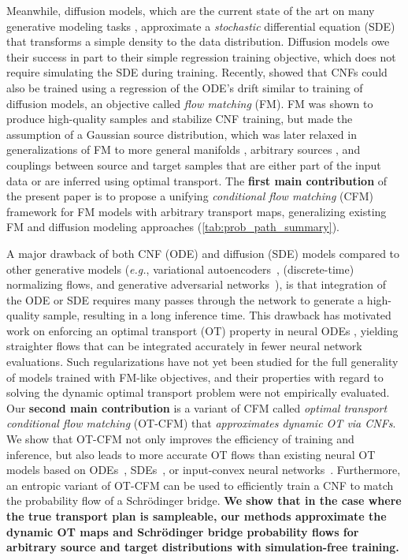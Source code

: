 \documentclass[10pt]{article}
\theoremstyle{plain}
\theoremstyle{definition}
\theoremstyle{remark}
\newcommand{\eg}{\textit{e.g.}}
\begin{document}
Meanwhile, diffusion models, which are the current state of the art on many generative modeling tasks \citep{dhariwal_diffusion_2021,austin_structured_2021,corso_diffdock_2022,watson_broadly_2022}, approximate a \emph{stochastic} differential equation (SDE) that transforms a simple density to the data distribution. Diffusion models owe their success in part to their simple regression training objective, which does not require simulating the SDE during training. Recently, \citep{lipman_flow_2022, albergo_building_2023, liu_rectified_2022} showed that CNFs could also be trained using a regression of the ODE's drift similar to training of diffusion models, an objective called \textit{flow matching} (FM). FM was shown to produce high-quality samples and stabilize CNF training, but made the assumption of a Gaussian source distribution, which was later relaxed in generalizations of FM to more general manifolds \citep{chen2023riemannian}, arbitrary sources \citep{pooladian_2023_multisample}, and couplings between source and target samples that are either part of the input data or are inferred using optimal transport.
The \textbf{first main contribution} of the present paper is to propose a unifying \emph{conditional flow matching} (CFM) framework for FM models with arbitrary transport maps, generalizing existing FM and diffusion modeling approaches (\autoref{tab:prob_path_summary}). 

A major drawback of both CNF (ODE) and diffusion (SDE) models compared to other generative models (\eg, variational autoencoders~\citep{kingma_auto-encoding_2014}, (discrete-time) normalizing flows, and generative adversarial networks~\citep{goodfellow_generative_2014}), is that integration of the ODE or SDE requires many passes through the network to generate a high-quality sample, resulting in a long inference time. This drawback has motivated work on enforcing an optimal transport (OT) property in neural ODEs \citep{tong_trajectorynet_2020,finlay_how_2020,onken_ot-flow_2021,liu_rectified_2022,liu_flow_2023}, yielding straighter flows that can be integrated accurately in fewer neural network evaluations. Such regularizations have not yet been studied for the full generality of models trained with FM-like objectives, and their properties with regard to solving the dynamic optimal transport problem were not empirically evaluated.
Our \textbf{second main contribution} is a variant of CFM called \emph{optimal transport conditional flow matching} (OT-CFM) that \emph{approximates dynamic OT via CNFs}.
We show that OT-CFM not only improves the efficiency of training and inference, but also leads to more accurate OT flows than existing neural OT models based on ODEs~\citep{tong_trajectorynet_2020,finlay_how_2020}, SDEs~\citep{de_bortoli_diffusion_2021,vargas_solving_2021}, or input-convex neural networks~\citep{makkuva_optimal_2020}. 
Furthermore, an entropic variant of OT-CFM can be used to efficiently train a CNF to match the probability flow of a Schr\"odinger bridge. 
{\textbf{We show that in the case where the true transport plan is sampleable, our methods approximate the dynamic OT maps and Schr\"odinger bridge probability flows for arbitrary source and target distributions with simulation-free training.}}
\end{document}
